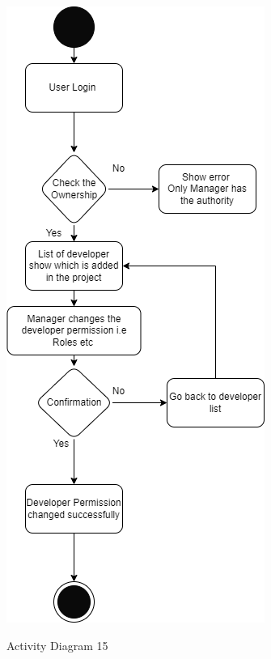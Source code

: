 \begin{figure}[H]
    \centering
    \caption{Activity Diagram 15}
    \includegraphics[scale=0.5]{./diagrams/Activity Diagram/ad-15.png}
    \label{fig:act-15}

\end{figure}


